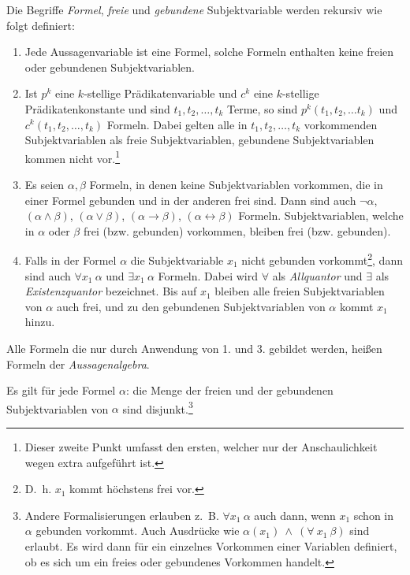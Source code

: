 \documentclass[a4paper,german,10pt,twoside]{book}
\theoremstyle{definition}
\theoremstyle{remark}
\begin{document}
\par
Die Begriffe \emph{Formel}, \emph{freie} und 
\emph{gebundene} Subjektvariable werden rekursiv wie folgt definiert:

\begin{enumerate}

\item Jede Aussagenvariable ist eine Formel, solche Formeln enthalten keine freien oder gebundenen Subjektvariablen. 
\item Ist $p^k$ eine $k$-stellige Pr{\"a}dikatenvariable und $c^k$ eine $k$-stellige Pr{\"a}dikatenkonstante und sind $t_1, t_2, \ldots, t_k$ Terme, so sind $p^k(t_1, t_2, \ldots t_k)$ und $c^k(t_1, t_2, \ldots, t_k)$ Formeln. Dabei gelten alle in 
$t_1, t_2, \ldots, t_k$ vorkommenden Subjektvariablen als freie Subjektvariablen, gebundene Subjektvariablen kommen nicht 
vor.\footnote{Dieser zweite Punkt umfasst den ersten, welcher nur der Anschaulichkeit wegen extra aufgef{\"u}hrt ist.} 

\item Es seien $\alpha, \beta$ Formeln, in denen keine Subjektvariablen vorkommen, die in einer Formel gebunden und in der anderen frei sind. Dann sind auch $\neg \alpha$, $(\alpha \land \beta)$, $(\alpha \lor \beta)$, $(\alpha \rightarrow \beta)$, $(\alpha \leftrightarrow \beta)$ Formeln. Subjektvariablen, welche in $\alpha$ oder $\beta$ frei (bzw. gebunden) vorkommen, bleiben frei (bzw. gebunden).

\item Falls in der Formel $\alpha$ die Subjektvariable $x_1$ nicht gebunden vorkommt\footnote{D.~h. $x_1$ kommt h{\"o}chstens frei vor.}, dann sind auch $\forall x_1~\alpha$ und $\exists x_1~\alpha$ Formeln. Dabei wird $\forall$ als
\emph{Allquantor} und $\exists$ als \emph{Existenzquantor} bezeichnet. Bis auf $x_1$ bleiben alle freien Subjektvariablen von $\alpha$ auch frei, und zu den gebundenen Subjektvariablen von $\alpha$ kommt $x_1$ hinzu. 

\end{enumerate}
Alle Formeln die nur durch Anwendung von 1. und 3. gebildet werden, hei{\ss}en Formeln der \emph{Aussagenalgebra}. 

\par
Es gilt f{\"u}r jede Formel $\alpha$: die Menge der freien und der gebundenen Subjektvariablen von $\alpha$ sind disjunkt.\footnote{Andere Formalisierungen erlauben z.~B. $\forall x_1~\alpha$ auch dann, wenn $x_1$ schon in $\alpha$ gebunden vorkommt. Auch Ausdr{\"u}cke wie $\alpha(x_1)~\land~(\forall~x_1~\beta)$ sind erlaubt. Es wird dann
f{\"u}r ein einzelnes Vorkommen einer Variablen definiert, ob es sich um ein freies oder gebundenes Vorkommen handelt.}
\end{document}
